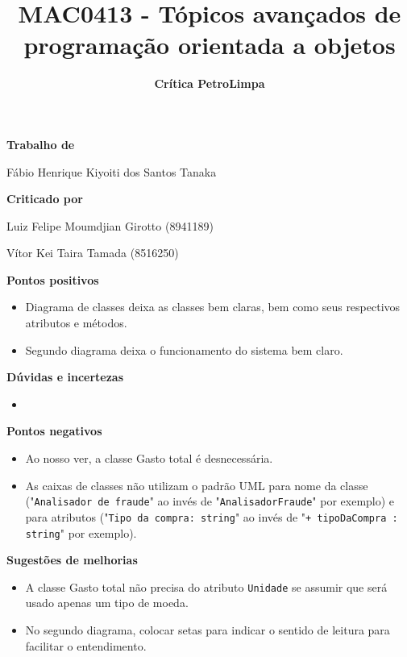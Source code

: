 \documentclass{article}
\title{\textbf{MAC0413 - Tópicos avançados de programação orientada a objetos}}
\author{\textbf{Crítica PetroLimpa}}
\date{}
\begin{document}
\maketitle

\begin{center}
\textbf{\large{Trabalho de}}

Fábio Henrique Kiyoiti dos Santos Tanaka

\bigskip
\textbf{\large{Criticado por}}

Luiz Felipe Moumdjian Girotto (8941189)

Vítor Kei Taira Tamada (8516250)
\end{center}
\begin{flushleft}

\textbf{\LARGE{Pontos positivos}}

\begin{itemize}

\item Diagrama de classes deixa as classes bem claras, bem como seus respectivos atributos e métodos.

\item Segundo diagrama deixa o funcionamento do sistema bem claro.

\end{itemize}

\bigskip
\bigskip
\textbf{\LARGE{Dúvidas e incertezas}}

\begin{itemize}

\item 

\end{itemize}

\bigskip
\bigskip
\textbf{\LARGE{Pontos negativos}}

\begin{itemize}

\item Ao nosso ver, a classe Gasto total é desnecessária.

\item As caixas de classes não utilizam o padrão UML para nome da classe ("\texttt{Analisador de fraude}" ao invés de "\texttt{AnalisadorFraude}" por exemplo) e para atributos ("\texttt{Tipo da compra: string}" ao invés de "\texttt{+ tipoDaCompra : string}" por exemplo).

\end{itemize}

\bigskip
\bigskip
\textbf{\LARGE{Sugestões de melhorias}}

\begin{itemize}

\item A classe Gasto total não precisa do atributo \texttt{Unidade} se assumir que será usado apenas um tipo de moeda.

\item No segundo diagrama, colocar setas para indicar o sentido de leitura para facilitar o entendimento.

\end{itemize}
\end{flushleft}
\end{document}
